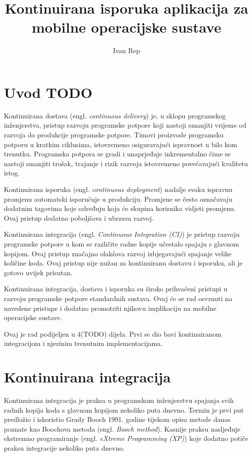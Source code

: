 \documentclass[times, utf8, seminar, numeric]{fer}
\newcommand{\eng}[1]{(engl. \textit{#1})}
\begin{document}
\nocite{*}

\title{Kontinuirana isporuka aplikacija za mobilne operacijske sustave}

\author{Ivan Rep}


\maketitle

\tableofcontents

\chapter{Uvod TODO}
Kontinuirana dostava \eng{continuous delivery} je, u sklopu programskog inženjerstva, pristup razvoju programske potpore koji nastoji smanjiti vrijeme od razvoja do produkcije programske potpore. Timovi proizvode programsku potporu u kratkim ciklusima, istovremeno osiguravajući ispravnost u bilo kom trenutku. Programska potpora se gradi i unaprjeđuje inkrementalno čime se nastoji smanjiti trošak, trajanje i rizik razvoja istovremeno povećavajući kvalitetu istog.

Kontinuirana isporuka \eng{continuous deployment} nadalje svaku ispravnu promjenu automatski isporučuje u produkciju. Promjene se često označavaju dodatnim tagovima koje određuju koja će skupina korisnika vidjeti promjenu. Ovaj pristup dodatno poboljšava i ubrzava razvoj.

Kontinuirana integracija \eng{Continuous Integration (CI)} je pristup razvoju programske potpore u kom se različite radne kopije učestalo spajaju s glavnom kopijom. Ovaj pristup značajno olakšava razvoj izbjegavajući spajanje velike količine koda. Ovaj pristup nije nužan za kontinuiranu dostavu i isporuku, ali je gotovo uvijek prisutan.

Kontinuirana integracija, dostava i isporuka su široko prihvaćeni pristupi u razvoju programske potpore standardnih sustava. Ovaj će se rad osvrnuti na navedene pristupe i dodatno promotriti njihovu implikaciju na mobilne operacijske sustave.

Ovaj je rad podijeljen u 4(TODO) dijela. Prvi se dio bavi kontinuiranom integracijom i njezinim trenutnim implementacijama.

\chapter{Kontinuirana integracija}
Kontinuirana integracija je praksa u programskom inženjerstvu spajanja svih radnih kopija koda s glavnom kopijom nekoliko puta dnevno. Termin je prvi put predložio i iskoristio Grady Booch 1991. godine tijekom opisa metode danas poznate kao Boochova metoda \eng{Booch method}\citep{wiki:BoochMethod}. Kasnije praksu nasljeđuje ekstremno programiranje \eng{eXtreme Programming (XP)} koje dodatno potiče praksu integracije nekoliko puta dnevno\citep{wiki:CI}.
\end{document}
